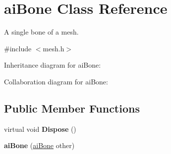 \hypertarget{structai_bone}{\section{ai\+Bone Class Reference}
\label{structai_bone}
}


A single bone of a mesh.  




{\ttfamily \#include $<$mesh.\+h$>$}



Inheritance diagram for ai\+Bone\+:


Collaboration diagram for ai\+Bone\+:
\subsection*{Public Member Functions}
\begin{DoxyCompactItemize}
\item 
\hypertarget{structai_bone_af976702a17388d19a3a283fd83d81c4a}{virtual void {\bfseries Dispose} ()}\label{structai_bone_af976702a17388d19a3a283fd83d81c4a}

\item 
\hypertarget{structai_bone_acafcb55802964c0a0f0bcf09b2091cec}{{\bfseries ai\+Bone} (\hyperlink{structai_bone}{ai\+Bone} other)}\label{structai_bone_acafcb55802964c0a0f0bcf09b2091cec}

\end{DoxyCompactItemize}
